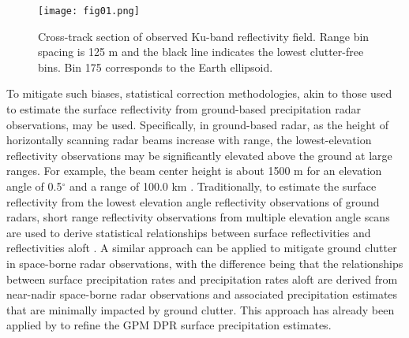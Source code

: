 \documentclass{ametsocV6.1} %
\begin{document}
\begin{figure}[h]
        \centering
        \texttt{[image: fig01.png]}
        \caption{Cross-track section of observed Ku-band reflectivity field.
        Range bin spacing is 125 m and the black line indicates the lowest clutter-free bins. Bin 175 corresponds to the Earth ellipsoid.}
        \label{fig:figObsZ}
\end{figure}
    
To mitigate such biases, statistical correction methodologies, akin to those used to estimate the surface reflectivity from ground-based precipitation radar observations, may be used. Specifically, in ground-based radar, as the height of horizontally scanning radar beams increase with range, the lowest-elevation reflectivity observations may be significantly elevated above the ground at large ranges.  For example, the beam center height is about 1500 m for an elevation angle of 0.5$^\circ$ and a range of 100.0 km \citep{beamwidth2023}. Traditionally, to estimate the surface reflectivity from the lowest elevation angle reflectivity observations of ground radars, short range reflectivity observations from multiple elevation angle scans are used to derive statistical relationships between surface reflectivities and reflectivities aloft \citep{koistinen1991}. A similar approach can be applied to mitigate ground clutter in space-borne radar observations, with the difference being that the relationships between surface precipitation rates and precipitation rates aloft are derived from near-nadir space-borne radar observations and associated precipitation estimates that are minimally impacted by ground clutter.  This approach has already been applied by \cite{hirose2021} to refine the GPM DPR surface precipitation estimates.
\end{document}
